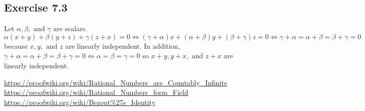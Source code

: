 \documentclass{article}
\theoremstyle{thmstyleone}
\theoremstyle{thmstyletwo}
\theoremstyle{thmstylethree}
\begin{document}
\subsection{Exercise 7.3}
Let $\alpha,\beta, \text{ and }\gamma$ are scalars.
$\alpha(x+y)+\beta(y+z)+\gamma(z+x)=0 \iff (\gamma+\alpha)x+(\alpha+\beta)y+(\beta+\gamma)z=0 \iff \gamma+\alpha=\alpha+\beta=\beta+\gamma=0$ because $x,y,\text{ and }z$ are linearly independent. In addition, $\gamma+\alpha=\alpha+\beta=\beta+\gamma=0 \iff \alpha=\beta=\gamma=0$ so $x+y,y+x,\text{ and }z+x$ are linearly independent.

\begin{thebibliography}{9}
 \url{https://proofwiki.org/wiki/Rational_Numbers_are_Countably_Infinite}
 \url{https://proofwiki.org/wiki/Rational_Numbers_form_Field}
 \url{https://proofwiki.org/wiki/Bezout\%27s_Identity}
\end{thebibliography}
\end{document}
